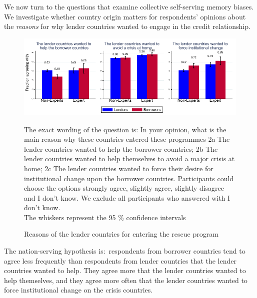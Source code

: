 We now turn to the questions that examine collective
self-serving memory biases. We investigate whether country
origin matters for respondents' opinions about the \textit{reasons} for why lender countries wanted to engage in the credit relationship. 
\begin{figure}[h!]
\caption{Reasons of the lender countries for entering the rescue program}
    \begin{center}
    \includegraphics[scale=1.2]{graph2.pdf}
    \label{fig:Figure1}
    \end{center}
     \tiny
     \begin{tablenotes} 
    {The exact wording of the question is: In your opinion, what is the main reason why these countries entered these programmes 2a The lender countries wanted to help the borrower countries; 2b The lender countries wanted to help themselves to avoid a major crisis at home; 2c The lender countries wanted to force their desire for institutional change upon the borrower countries. Participants could choose the options strongly agree, slightly agree, slightly disagree and I don't know. We exclude all participants who answered with I don't know.\\
    The whiskers represent the 95 \% confidence intervals}
    \end{tablenotes}
\end{figure}

The nation-serving hypothesis is:\ respondents from borrower countries tend
to agree less frequently than respondents from lender countries 
that the lender countries wanted to help. They agree more that
the lender countries wanted to help themselves, and they agree more 
often that the lender countries wanted to force institutional change on the
crisis countries.\textit{\ }

